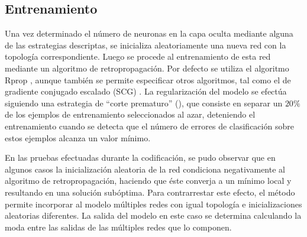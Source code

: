%
\subsection{Entrenamiento}
%
Una vez determinado el número de neuronas en la capa oculta mediante
alguna de las estrategias descriptas, se inicializa aleatoriamente una
nueva red con la topología correspondiente.
Luego se procede al entrenamiento de esta red mediante un algoritmo de
retropropagación.
Por defecto se utiliza el algoritmo {Rprop} \cite{rprop}, aunque
también se permite especificar otros algoritmos, tal como el de
gradiente conjugado escalado (SCG) \cite{scg}.
La regularización del modelo se efectúa siguiendo una estrategia de
``corte prematuro'' (), que consiste en separar un
$20\%$ de los ejemplos de entrenamiento seleccionados al azar,
deteniendo el entrenamiento cuando se detecta que el número de errores
de clasificación sobre estos ejemplos alcanza un valor mínimo.

En las pruebas efectuadas durante la codificación, se pudo observar
que en algunos casos la inicialización aleatoria de la red condiciona
negativamente al algoritmo de retropropagación, haciendo que éste
converja a un mínimo local y resultando en una solución subóptima.
Para contrarrestar este efecto, el método permite incorporar al modelo
múltiples redes con igual topología e inicializaciones aleatorias
diferentes.
La salida del modelo en este caso se determina calculando la moda
entre las salidas de las múltiples redes que lo componen.
